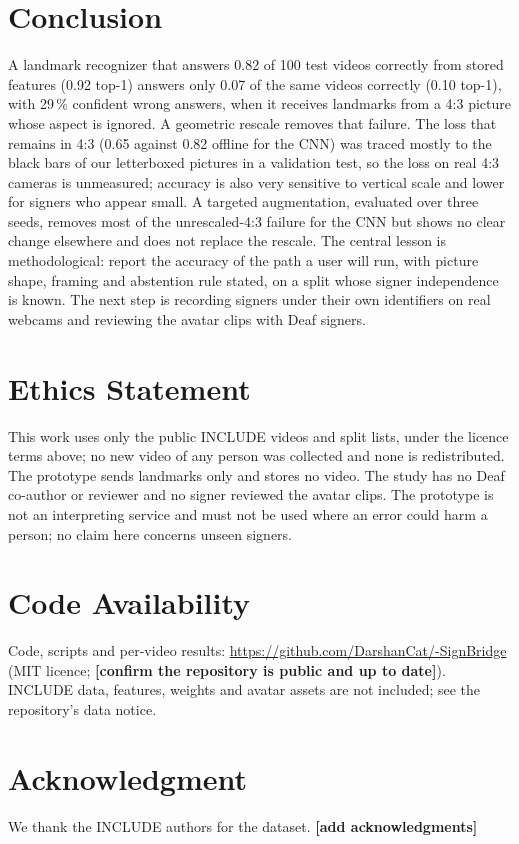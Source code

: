 \documentclass[conference]{IEEEtran}
\newcommand{\todo}[1]{{\color{blue}\textbf{[#1]}}}
\begin{document}
\section{Conclusion}
A landmark recognizer that answers 0.82 of 100 test videos correctly from stored features (0.92 top-1) answers only 0.07 of the same videos correctly (0.10 top-1), with 29\,\% confident wrong answers, when it receives landmarks from a 4:3 picture whose aspect is ignored. A geometric rescale removes that failure. The loss that remains in 4:3 (0.65 against 0.82 offline for the CNN) was traced mostly to the black bars of our letterboxed pictures in a validation test, so the loss on real 4:3 cameras is unmeasured; accuracy is also very sensitive to vertical scale and lower for signers who appear small. A targeted augmentation, evaluated over three seeds, removes most of the unrescaled-4:3 failure for the CNN but shows no clear change elsewhere and does not replace the rescale. The central lesson is methodological: report the accuracy of the path a user will run, with picture shape, framing and abstention rule stated, on a split whose signer independence is known. The next step is recording signers under their own identifiers on real webcams and reviewing the avatar clips with Deaf signers.

\section*{Ethics Statement}
This work uses only the public INCLUDE videos and split lists, under the licence terms above; no new video of any person was collected and none is redistributed. The prototype sends landmarks only and stores no video. The study has no Deaf co-author or reviewer and no signer reviewed the avatar clips. The prototype is not an interpreting service and must not be used where an error could harm a person; no claim here concerns unseen signers.

\section*{Code Availability}
Code, scripts and per-video results: \url{https://github.com/DarshanCat/-SignBridge} (MIT licence; \todo{confirm the repository is public and up to date}). INCLUDE data, features, weights and avatar assets are not included; see the repository's data notice.

\section*{Acknowledgment}
We thank the INCLUDE authors for the dataset. \todo{add acknowledgments}



\end{document}
